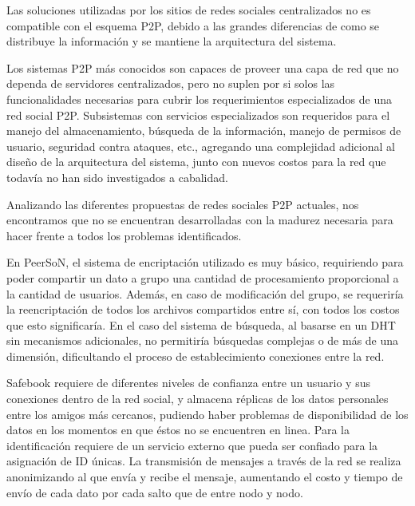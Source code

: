 
Las soluciones utilizadas por los sitios de redes sociales
centralizados no es compatible con el esquema P2P, debido a las grandes
diferencias de como se distribuye la información y se mantiene la arquitectura
del sistema.

Los sistemas P2P más conocidos son capaces de proveer una capa de red que no
dependa de servidores centralizados, pero no suplen por si solos las
funcionalidades necesarias para cubrir los requerimientos
especializados de una red social P2P. Subsistemas con servicios especializados
son requeridos para el manejo del almacenamiento, búsqueda de la información,
manejo de permisos de usuario, seguridad contra ataques, etc., agregando una
complejidad adicional al diseño de la arquitectura del sistema, junto con
nuevos costos para la red que todavía no han sido investigados a cabalidad.


Analizando las diferentes propuestas de redes sociales P2P actuales, nos
encontramos que no se encuentran desarrolladas con la madurez  necesaria para hacer
frente a todos los problemas identificados. 

En PeerSoN, el sistema de encriptación utilizado es muy básico, requiriendo para poder compartir
un dato a grupo una cantidad de procesamiento proporcional a la
cantidad de usuarios. Además, en caso de modificación del grupo, se requeriría
la reencriptación de todos los archivos compartidos entre sí, con todos los
costos que esto significaría. En el caso del sistema de búsqueda, al basarse en
un DHT sin mecanismos adicionales, no permitiría búsquedas complejas o de más
de una dimensión, dificultando el proceso de establecimiento conexiones entre
la red.

Safebook requiere de diferentes niveles de confianza entre un usuario y sus
conexiones dentro de la red social, y almacena réplicas de los datos personales
entre los amigos más cercanos, pudiendo haber problemas de disponibilidad de
los datos en los momentos en que éstos no se encuentren en linea. Para la identificación requiere de un servicio 
externo que pueda ser confiado para la asignación de ID únicas. La transmisión
de mensajes a través de la red se realiza anonimizando al que envía y recibe el
mensaje, aumentando el costo y tiempo de envío de cada dato por cada salto que
de entre nodo y nodo.

